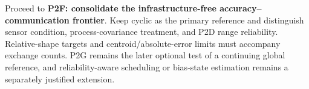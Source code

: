 Proceed to \textbf{P2F: consolidate the infrastructure-free accuracy--communication frontier}. Keep cyclic as the primary reference and distinguish sensor condition, process-covariance treatment, and P2D range reliability. Relative-shape targets and centroid/absolute-error limits must accompany exchange counts. P2G remains the later optional test of a continuing global reference, and reliability-aware scheduling or bias-state estimation remains a separately justified extension.
\endgroup
